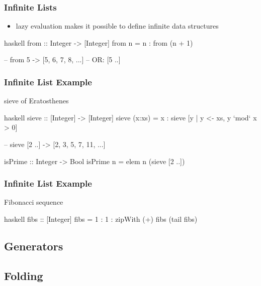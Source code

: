 \documentclass[dvipsnames]{beamer}
\theoremstyle{plain}
\begin{document}
\begin{frame}[fragile]
  \frametitle{Infinite Lists}

  \begin{itemize}
    \item lazy evaluation makes it possible to define infinite data structures
  \end{itemize}

  \begin{exampleblock}{}
    \begin{pygments}{haskell}
from :: Integer -> [Integer]
from n = n : from (n + 1)

-- from 5 -> [5, 6, 7, 8, ...]
-- OR: [5 ..]
    \end{pygments}
  \end{exampleblock}
\end{frame}

\begin{frame}[fragile]
  \frametitle{Infinite List Example}

  \begin{exampleblock}{sieve of Eratosthenes}
    \begin{pygments}{haskell}
sieve :: [Integer] -> [Integer]
sieve (x:xs) = x : sieve [y | y <- xs, y `mod` x > 0]

-- sieve [2 ..] -> [2, 3, 5, 7, 11, ...]

isPrime :: Integer -> Bool
isPrime n = elem n (sieve [2 ..])
    \end{pygments}
  \end{exampleblock}
\end{frame}

\begin{frame}[fragile]
  \frametitle{Infinite List Example}

  \begin{exampleblock}{Fibonacci sequence}
    \begin{pygments}{haskell}
fibs :: [Integer]
fibs = 1 : 1 : zipWith (+) fibs (tail fibs)
    \end{pygments}
  \end{exampleblock}
\end{frame}

\subsection{Generators}

\subsection{Folding}
\end{document}
